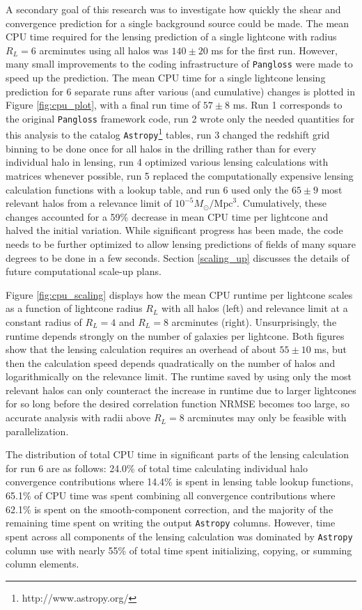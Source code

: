 \documentclass[%
 reprint,
 amsmath,amssymb,
 aps,nofootinbib
]{revtex4-1}
\begin{document}
A secondary goal of this research was to investigate how quickly the shear and convergence prediction for a single background source could be made. The mean CPU time required for the lensing prediction of a single lightcone with radius $R_L=6$ arcminutes using all halos was ${140\pm20}$ ms for the first run. However, many small improvements to the coding infrastructure of \texttt{Pangloss} were made to speed up the prediction. The mean CPU time for a single lightcone lensing prediction for 6 separate runs after various (and cumulative) changes is plotted in Figure \ref{fig:cpu_plot}, with a final run time of $57\pm8$ ms. Run 1 corresponds to the original \texttt{Pangloss} framework code, run 2 wrote only the needed quantities for this analysis to the catalog \texttt{Astropy}\footnote{http://www.astropy.org/} tables, run 3 changed the redshift grid binning to be done once for all halos in the drilling rather than for every individual halo in lensing, run 4 optimized various lensing calculations with matrices whenever possible, run 5 replaced the computationally expensive lensing calculation functions with a lookup table, and run 6 used only the ${65\pm9}$ most relevant halos from a relevance limit of ${10^{-5}M_\odot/\text{Mpc}^3}$. Cumulatively, these changes accounted for a 59\% decrease in mean CPU time per lightcone and halved the initial variation. While significant progress has been made, the code needs to be further optimized to allow lensing predictions of fields of many square degrees to be done in a few seconds. Section \ref{scaling_up} discusses the details of future computational scale-up plans.

Figure \ref{fig:cpu_scaling} displays how the mean CPU runtime per lightcone scales as a function of lightcone radius $R_L$ with all halos (left) and relevance limit at a constant radius of $R_L=4$ and $R_L=8$ arcminutes (right). Unsurprisingly, the runtime depends strongly on the number of galaxies per lightcone. Both figures show that the lensing calculation requires an overhead of about ${55\pm10}$ ms, but then the calculation speed depends quadratically on the number of halos and logarithmically on the relevance limit. The runtime saved by using only the most relevant halos can only counteract the increase in runtime due to larger lightcones for so long before the desired correlation function NRMSE becomes too large, so accurate analysis with radii above $R_L=8$ arcminutes may only be feasible with parallelization.

The distribution of total CPU time in significant parts of the lensing calculation for run 6 are as follows: 24.0\% of total time calculating individual halo convergence contributions where 14.4\% is spent in lensing table lookup functions, 65.1\% of CPU time was spent combining all convergence contributions where 62.1\% is spent on the smooth-component correction, and the majority of the remaining time spent on writing the output \texttt{Astropy} columns. However, time spent across all components of the lensing calculation was dominated by \texttt{Astropy} column use with nearly 55\% of total time spent initializing, copying, or summing column elements.
\end{document}

